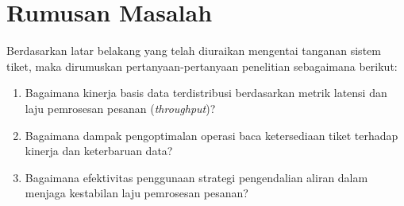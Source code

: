 \section{Rumusan Masalah}
\label{sec:rumusan-masalah}

Berdasarkan latar belakang yang telah diuraikan mengentai tanganan sistem tiket, maka dirumuskan pertanyaan-pertanyaan penelitian sebagaimana berikut:

\begin{enumerate}
    \item Bagaimana kinerja basis data terdistribusi berdasarkan metrik latensi dan laju pemrosesan pesanan (\textit{throughput})?
    \item Bagaimana dampak pengoptimalan operasi baca ketersediaan tiket terhadap kinerja dan keterbaruan data?
    \item Bagaimana efektivitas penggunaan strategi pengendalian aliran dalam menjaga kestabilan laju pemrosesan pesanan?
\end{enumerate}
